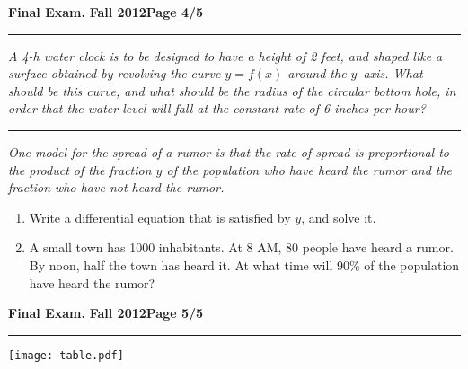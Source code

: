 \documentclass[12pt]{article}
\begin{document}
\hfill{\large\bf Final Exam.}\hfill{\large\bf
  Fall 2012}\hfill{\large\bf Page 4/5}\hrule

\bigskip
{\problem[10pts] \em A 4-h water clock is to be designed to have a height of 2 feet, and shaped like a surface obtained by revolving the curve $y=f(x)$ around the $y$--axis.  What should be this curve, and what should be the radius of the circular bottom hole, in order that the water level will fall at the constant rate of 6 inches per hour?}

\vspace{8cm}
\hrule
{\problem [15pts] \em One model for the spread of a rumor is that the rate of spread is proportional to the product of the fraction $y$ of the population who have heard the rumor and the fraction who have not heard the rumor.}
\begin{enumerate}
\item Write a differential equation that is satisfied by $y$, and solve it.

\vspace{4cm}
\item A small town has 1000 inhabitants.  At 8 AM, 80 people have heard a rumor.  By noon, half the town has heard it.  At what time will 90\% of the population have heard the rumor?

\end{enumerate}
\newpage

\hfill{\large\bf Final Exam.}\hfill{\large\bf
  Fall 2012}\hfill{\large\bf Page 5/5}\hrule

\bigskip
\begin{center}
\texttt{[image: table.pdf]}
\end{center}
\end{document}
